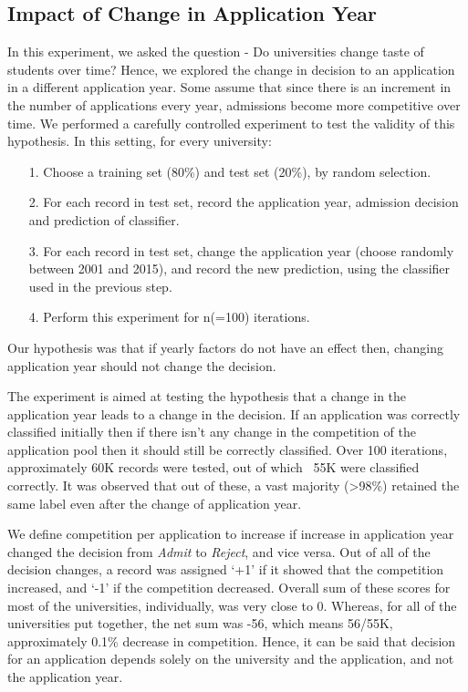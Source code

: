 \documentclass{sig-alternate-05-2015}
\begin{document}
\subsection{Impact of Change in Application Year}
\label{subsec:year-change-exp}
In this experiment, we asked the question - Do universities change taste of students over time? Hence, we explored the change in decision to an application in a different application year. Some assume that since there is an increment in the number of applications every year, admissions become more competitive over time. We performed a carefully controlled experiment to test the validity of this hypothesis. In this setting, for every university:
\begin{itemize}
\item[1.]Choose a training set (80\%) and test set (20\%), by random selection.
\item[2.]For each record in test set, record the application year, admission decision and prediction of classifier.
\item[3.]For each record in test set, change the application year (choose randomly between 2001 and 2015), and record the new prediction, using the classifier used in the previous step.
\item[4.]Perform this experiment for n(=100) iterations.
\end{itemize}
Our hypothesis was that if yearly factors do not have an effect then, changing application year should not change the decision.

The experiment is aimed at testing the hypothesis that a change in the application year leads to a change in the decision. If an application was correctly classified initially then if there isn't any change in the competition of the application pool then it should still be correctly classified. Over 100 iterations, approximately 60K records were tested, out of which ~55K were classified correctly. It was observed that out of these, a vast majority (>98\%) retained the same label even after the change of application year.

We define competition per application to increase if increase in application year changed the decision from \textit{Admit} to \textit{Reject}, and vice versa. Out of all of the decision changes, a record was assigned `+1' if it showed that the competition increased, and `-1' if the competition decreased. Overall sum of these scores for most of the universities, individually, was very close to 0. Whereas, for all of the universities put together, the net sum was -56, which means 56/55K, approximately 0.1\% decrease in competition. Hence, it can be said that decision for an application depends solely on the university and the application, and not the application year.\\
\end{document}
